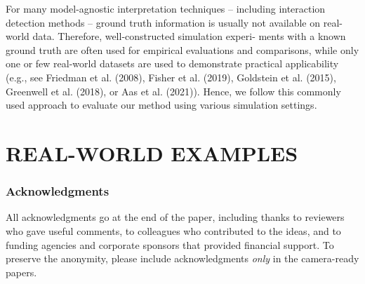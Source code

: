 \documentclass[twoside]{article}
\begin{document}
For many model-agnostic interpretation techniques
– including interaction detection methods – ground
truth information is usually not available on real-world
data. Therefore, well-constructed simulation experi-
ments with a known ground truth are often used for
empirical evaluations and comparisons, while only one
or few real-world datasets are used to demonstrate
practical applicability (e.g., see Friedman et al. (2008),
Fisher et al. (2019), Goldstein et al. (2015), Greenwell
et al. (2018), or Aas et al. (2021)). Hence, we follow
this commonly used approach to evaluate our method
using various simulation settings.

\section{REAL-WORLD EXAMPLES}


\subsubsection*{Acknowledgments}
All acknowledgments go at the end of the paper, including thanks to reviewers who gave useful comments, to colleagues who contributed to the ideas, and to funding agencies and corporate sponsors that provided financial support. 
To preserve the anonymity, please include acknowledgments \emph{only} in the camera-ready papers.


\end{document}
